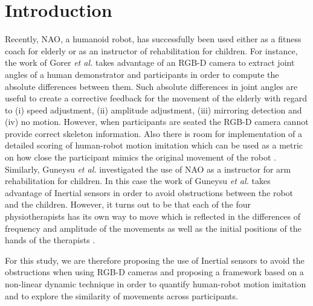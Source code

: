 \documentclass{sig-alternate-05-2015}
\begin{document}
\section{Introduction}
Recently, NAO, a humanoid robot, has successfully been used either as a fitness coach for elderly 
or as an instructor of rehabilitation for children.
For instance, the work of Gorer \textit{et al.} takes advantage of an RGB-D camera to 
extract joint angles of a human demonstrator and participants in order to
compute the absolute differences between them. Such absolute differences
in joint angles are useful to create a corrective feedback for the movement of the elderly 
with regard to (i) speed adjustment, (ii) amplitude adjustment, (iii) mirroring detection
and (iv) no motion.
However, when participants are seated the RGB-D camera cannot provide correct skeleton information.
Also there is room for implementation of a detailed scoring 
of human-robot motion imitation which can be used as a metric on how close the participant mimics the original movement 
of the robot \cite{Gorer2013, Gorer2016}.
Similarly, Guneysu \textit{et al.} investigated the use of NAO
as a instructor for arm rehabilitation for children. 
In this case the work of Guneysu \textit{et al.} takes advantage of 
Inertial sensors in order to avoid obstructions between the robot and the children.
However,  it turns out to be that
each of the four physiotherapists has its own way to move
which is reflected in the differences of frequency and amplitude of the movements
as well as the initial positions of the hands of the therapists \cite{Guneysu2015}.

For this study, we are therefore proposing the use 
of Inertial sensors to avoid the obstructions when using RGB-D cameras 
\cite{Gorer2013, Gorer2016} and proposing a framework based on a non-linear dynamic technique 
in order to quantify human-robot motion imitation 
and to explore the similarity of movements across participants.



\end{document}
